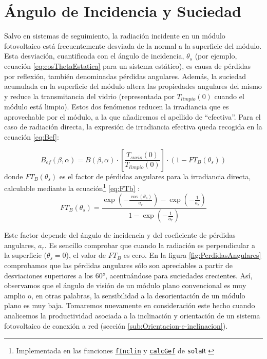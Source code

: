 \section{Ángulo de Incidencia y Suciedad\label{sec:RadiacionEfectiva}}

Salvo en sistemas de seguimiento, la radiación incidente en un módulo
fotovoltaico está frecuentemente desviada de la normal a la superficie
del módulo. Esta desviación, cuantificada con el ángulo de incidencia,
$\theta_{s}$ (por ejemplo, ecuación \ref{eq:cosThetaEstatica} para
un sistema estático), es causa de pérdidas por reflexión, también
denominadas pérdidas angulares. Además, la suciedad acumulada en la
superficie del módulo altera las propiedades angulares del mismo y
reduce la transmitancia del vidrio (representada por $T_{limpio}(0)$
cuando el módulo está limpio). Estos dos fenómenos reducen la irradiancia
que es aprovechable por el módulo, a la que añadiremos el apellido
de {}``efectiva''. Para el caso de radiación directa, la expresión
de irradiancia efectiva queda recogida en la ecuación \ref{eq:Bef}:

\begin{equation}
B_{ef}(\beta,\alpha)=B(\beta,\alpha)\cdot\left[\frac{T_{sucio}(0)}{T_{limpio}(0)}\right]\cdot(1-FT_{B}(\theta_{s}))\label{eq:Bef}\end{equation}
donde $FT_{B}(\theta_{s})$
es el factor de pérdidas angulares para la irradiancia directa, calculable
mediante la ecuación\footnote{Implementada en las funciones
  \href{http://search.r-project.org/R/library/solaR/html/fInclin.html}{\texttt{fInclin}}
  y
  \href{http://search.r-project.org/R/library/solaR/html/calcGef.html}{\texttt{calcGef}}
  de \texttt{solaR} \cite{Perpinan2012b}} \ref{eq:FTb} \cite{Martin.Ruiz2001}: 
\begin{equation}
FT_{B}(\theta_{s})=\frac{\exp(-\frac{\cos(\theta_{s})}{a_{r}})-\exp(-\frac{1}{a_{r}})}{1-\exp(-\frac{1}{a_{r}})}
\label{eq:FTb}
\end{equation}


Este factor depende del ángulo de incidencia y del coeficiente de
pérdidas angulares, $a_{r}$. Es sencillo comprobar que cuando la
radiación es perpendicular a la superficie ($\theta_{s}=0$), el valor
de $FT_{B}$ es cero. En la figura \ref{fig:PerdidasAngulares} comprobamos
que las pérdidas angulares sólo son apreciables a partir de desviaciones
superiores a los $\ang{60}$, acentuándose para suciedades crecientes.
Así, observamos que el ángulo de visión de un módulo plano convencional
es muy amplio o, en otras palabras, la sensibilidad a la desorientación
de un módulo plano es muy baja. Tomaremos nuevamente en consideración
este hecho cuando analicemos la productividad asociada a la inclinación
y orientación de un sistema fotovoltaico de conexión a red (sección
\ref{sub:Orientacion-e-inclinacion}).

